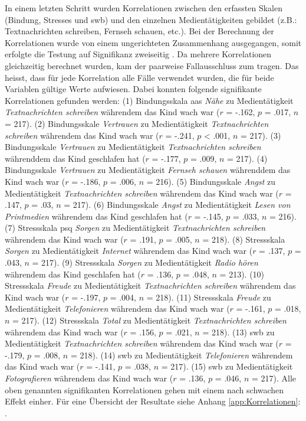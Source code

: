 In einem letzten Schritt wurden Korrelationen zwischen den erfassten Skalen (Bindung, Stresses und \acrshort{swb}) und den einzelnen Medientätigkeiten gebildet (z.B.: Textnachrichten schreiben, Fernseh schauen, etc.).  Bei der Berechnung der Korrelationen wurde von einem ungerichteten Zusammenhang ausgegangen, somit erfolgte die Testung auf Signifikanz zweiseitig \cite{UniversitatZurich2018}. Da mehrere Korrelationen gleichzeitig berechnet wurden, kam der paarweise Fallausschluss zum tragen. Das heisst, dass für jede Korrelation alle Fälle verwendet wurden, die für beide Variablen gültige Werte aufwiesen. Dabei konnten folgende signifikante Korrelationen gefunden werden: (1) Bindungsskala \acrshort{aas} \textit{Nähe} zu Medientätigkeit \textit{Textnachrichten schreiben} währendem das Kind wach war ($r$ = -.162, $p$ = .017, $n$ = 217). (2) Bindungsskale \textit{Vertrauen} zu Medientätigkeit \textit{Textnachrichten schreiben} währendem das Kind wach war ($r$ = -.241, $p$ < .001, $n$ = 217). (3) Bindungsskale \textit{Vertrauen} zu Medientätigkeit \textit{Textnachrichten schreiben} währenddem das Kind geschlafen hat ($r$ = -.177, $p$ = .009, $n$ = 217). (4) Bindungsskale \textit{Vertrauen} zu Medientätigkeit \textit{Fernseh schauen} währenddem das Kind wach war ($r$ = -.186, $p$ = .006, $n$ = 216). (5) Bindungsskale \textit{Angst} zu Medientätigkeit \textit{Textnachrichten schreiben} währendem das Kind wach war ($r$ = .147, $p$ = .03, $n$ = 217). (6) Bindungsskale \textit{Angst} zu Medientätigkeit \textit{Lesen von Printmedien} währendem das Kind geschlafen hat ($r$ = -.145, $p$ = .033, $n$ = 216). (7) Stressskala \acrshort{psq} \textit{Sorgen} zu Medientätigkeit \textit{Textnachrichten schreiben} währendem das Kind wach war ($r$ = .191, $p$ = .005, $n$ = 218). (8) Stressskala \textit{Sorgen} zu Medientätigkeit \textit{Internet} währendem das Kind wach war ($r$ = .137, $p$ = .043, $n$ = 217). (9) Stressskala \textit{Sorgen} zu Medientätigkeit \textit{Radio hören} währendem das Kind geschlafen hat ($r$ = .136, $p$ = .048, $n$ = 213). (10) Stressskala \textit{Freude} zu Medientätigkeit \textit{Textnachrichten schreiben} währendem das Kind wach war ($r$ = -.197, $p$ = .004, $n$ = 218). (11) Stressskala \textit{Freude} zu Medientätigkeit \textit{Telefonieren} währendem das Kind wach war ($r$ = -.161, $p$ = .018, $n$ = 217). (12) Stressskala \textit{Total} zu Medientätigkeit \textit{Textnachrichten schreiben} währendem das Kind wach war ($r$ = .156, $p$ = .021, $n$ = 218). (13) \acrfull{swb} zu Medientätigkeit \textit{Textnachrichten schreiben} währendem das Kind wach war ($r$ = -.179, $p$ = .008, $n$ = 218). (14) \acrshort{swb} zu Medientätigkeit \textit{Telefonieren} währendem das Kind wach war ($r$ = -.141, $p$ = .038, $n$ = 217). (15) \acrshort{swb} zu Medientätigkeit \textit{Fotografieren} währendem das Kind wach war ($r$ = .136, $p$ = .046, $n$ = 217). Alle oben genannten signifikanten Korrelationen gehen mit einem nach  schwachen Effekt einher. Für eine Übersicht der Resultate siehe Anhang \ref{app:Korrelationen}: \textit{}.




